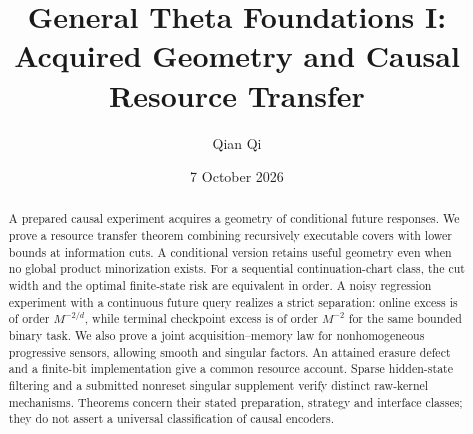 \documentclass[11pt]{amsart}
\title{General Theta Foundations I:\\Acquired Geometry and Causal Resource Transfer}
\author{Qian Qi}
\date{7 October 2026}
\theoremstyle{definition}
\theoremstyle{remark}
\begin{document}
\begin{abstract}
A prepared causal experiment acquires a geometry of conditional future responses. We prove a resource transfer theorem combining recursively executable covers with lower bounds at information cuts. A conditional version retains useful geometry even when no global product minorization exists. For a sequential continuation-chart class, the cut width and the optimal finite-state risk are equivalent in order. A noisy regression experiment with a continuous future query realizes a strict separation: online excess is of order $M^{-2/d}$, while terminal checkpoint excess is of order $M^{-2}$ for the same bounded binary task. We also prove a joint acquisition--memory law for nonhomogeneous progressive sensors, allowing smooth and singular factors. An attained erasure defect and a finite-bit implementation give a common resource account. Sparse hidden-state filtering and a submitted nonreset singular supplement verify distinct raw-kernel mechanisms. Theorems concern their stated preparation, strategy and interface classes; they do not assert a universal classification of causal encoders.
\end{abstract}
\maketitle








\appendix


\end{document}
